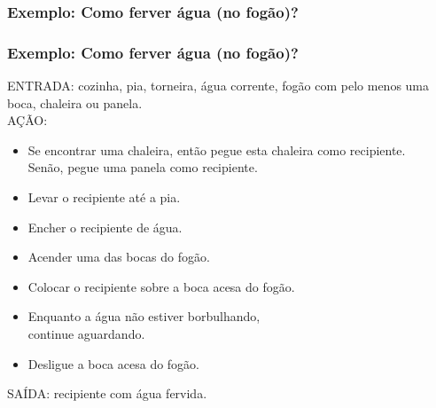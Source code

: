\documentclass[hyperref={pdfpagelabels=false}]{beamer}
\begin{document}
\begin{frame}
   \frametitle{Exemplo: Como ferver água (no fogão)?}
\end{frame}
\begin{frame}
   \frametitle{Exemplo: Como ferver água (no fogão)?}
   ENTRADA: cozinha, pia, torneira, água corrente, fogão com pelo menos uma boca, chaleira ou panela.\\
   AÇÃO: 
   \begin{itemize}
      \item Se encontrar uma chaleira, então pegue esta chaleira como recipiente. \\
				Senão, pegue uma panela como recipiente.
      \item Levar o recipiente até a pia.
      \item Encher o recipiente de água.
      \item Acender uma das bocas do fogão.
      \item Colocar o recipiente sobre a boca acesa do fogão.
      \item Enquanto a água não estiver borbulhando, \\
				continue aguardando.
      \item Desligue a boca acesa do fogão.
   \end{itemize}
	SAÍDA: recipiente com água fervida.
\end{frame}
\end{document}
